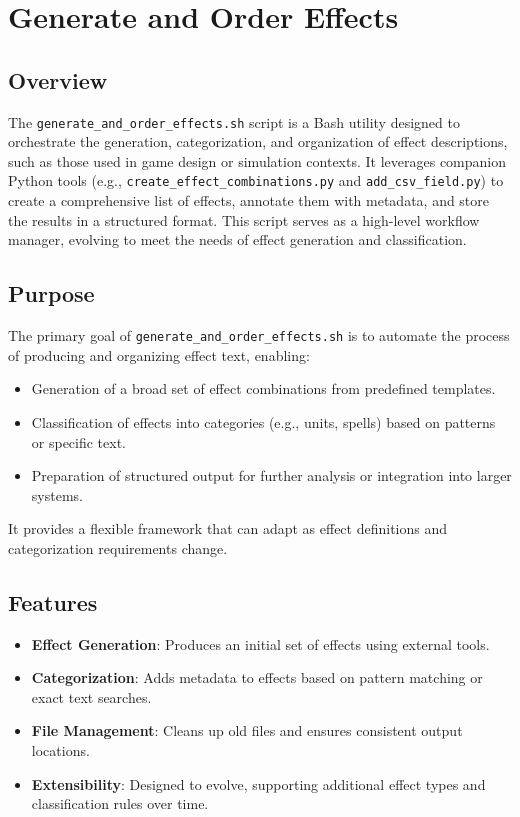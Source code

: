 \section{Generate and Order Effects}
\subsection{Overview}
The \texttt{generate\_and\_order\_effects.sh} script is a Bash utility designed to orchestrate the generation, categorization, and organization of effect descriptions, such as those used in game design or simulation contexts. It leverages companion Python tools (e.g., \texttt{create\_effect\_combinations.py} and \texttt{add\_csv\_field.py}) to create a comprehensive list of effects, annotate them with metadata, and store the results in a structured format. This script serves as a high-level workflow manager, evolving to meet the needs of effect generation and classification.

\subsection{Purpose}
The primary goal of \texttt{generate\_and\_order\_effects.sh} is to automate the process of producing and organizing effect text, enabling:
\begin{itemize}
    \item Generation of a broad set of effect combinations from predefined templates.
    \item Classification of effects into categories (e.g., units, spells) based on patterns or specific text.
    \item Preparation of structured output for further analysis or integration into larger systems.
\end{itemize}
It provides a flexible framework that can adapt as effect definitions and categorization requirements change.

\subsection{Features}
\begin{itemize}
    \item \textbf{Effect Generation}: Produces an initial set of effects using external tools.
    \item \textbf{Categorization}: Adds metadata to effects based on pattern matching or exact text searches.
    \item \textbf{File Management}: Cleans up old files and ensures consistent output locations.
    \item \textbf{Extensibility}: Designed to evolve, supporting additional effect types and classification rules over time.
\end{itemize}

